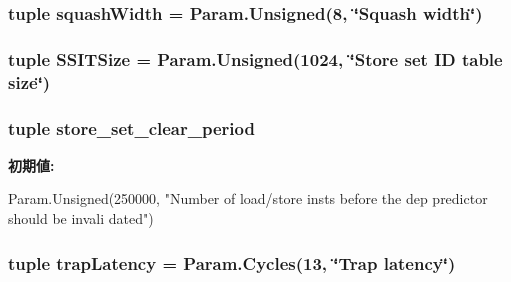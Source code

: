 \label{classO3CPU_1_1DerivO3CPU_a910857438278a89a287832cf7087317b}
\hypertarget{classO3CPU_1_1DerivO3CPU_a822a947e7bb7034547d91ec80d337303}{
\subsubsection[{squashWidth}]{\setlength{\rightskip}{0pt plus 5cm}tuple {\bf squashWidth} = Param.Unsigned(8, \char`\"{}Squash width\char`\"{})}}
\label{classO3CPU_1_1DerivO3CPU_a822a947e7bb7034547d91ec80d337303}
\hypertarget{classO3CPU_1_1DerivO3CPU_aaae81435109fd5abd8db9e1cac852536}{
\subsubsection[{SSITSize}]{\setlength{\rightskip}{0pt plus 5cm}tuple {\bf SSITSize} = Param.Unsigned(1024, \char`\"{}Store set ID table size\char`\"{})}}
\label{classO3CPU_1_1DerivO3CPU_aaae81435109fd5abd8db9e1cac852536}
\hypertarget{classO3CPU_1_1DerivO3CPU_aa49311e8ec513d42fb69e219d3deb35f}{
\subsubsection[{store\_\-set\_\-clear\_\-period}]{\setlength{\rightskip}{0pt plus 5cm}tuple {\bf store\_\-set\_\-clear\_\-period}}}
\label{classO3CPU_1_1DerivO3CPU_aa49311e8ec513d42fb69e219d3deb35f}
{\bfseries 初期値:}
\begin{DoxyCode}
Param.Unsigned(250000,
            "Number of load/store insts before the dep predictor should be invali
      dated")
\end{DoxyCode}
\hypertarget{classO3CPU_1_1DerivO3CPU_a2c19f8ca9c4486b056283762263259bd}{
\subsubsection[{trapLatency}]{\setlength{\rightskip}{0pt plus 5cm}tuple {\bf trapLatency} = Param.Cycles(13, \char`\"{}Trap latency\char`\"{})}}
